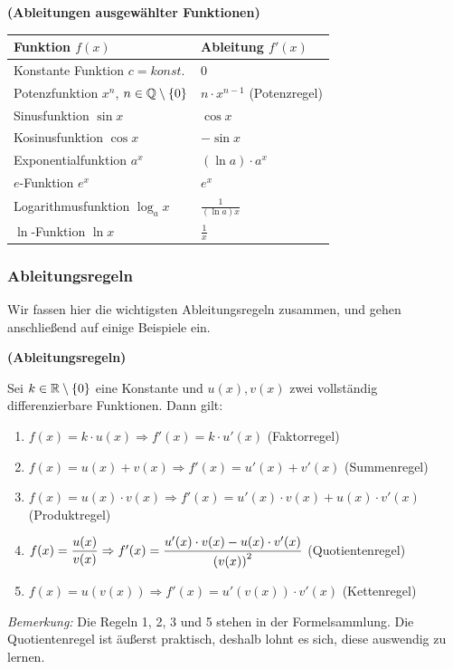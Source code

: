 \documentclass[ngerman, 12pt]{nssheetxea}
\begin{document}
\begin{theorem}\textbf{(Ableitungen ausgewählter Funktionen)} \par
\renewcommand{\arraystretch}{1.3}
\begin{tabularx}{\textwidth}{X | X}

\textbf{Funktion $f(x)$} & \textbf{Ableitung $f'(x)$} \\
\hline
Konstante Funktion \hfill $c=konst.$ & $0$ \\
\hline
Potenzfunktion \hfill $x^n$, $n\in\mathbb{Q} \setminus \{ 0 \}$ & $n\cdot x^{n-1}$ (Potenzregel) \\
\hline
Sinusfunktion \hfill $\sin x$ & $\cos x$ \\
\hline
Kosinusfunktion \hfill $\cos x$ & $-\sin x$ \\
\hline
Exponentialfunktion \hfill $a^x$ & $(\ln a)\cdot a^x$ \\
\hline
$e$-Funktion \hfill $e^x$ & $e^x$ \\
\hline
Logarithmusfunktion \hfill $\log_a x$ & $\frac{1}{(\ln a) x}$\\
\hline
$\ln$-Funktion \hfill $\ln x$ & $\frac{1}{x}$ \\
\end{tabularx}
\renewcommand{\arraystretch}{1}
\label{Satz:Ableitungen_Funktionen}
\end{theorem}

\subsubsection{Ableitungsregeln}
Wir fassen hier die wichtigsten Ableitungsregeln zusammen, und gehen anschließend auf einige Beispiele ein.

\begin{theorem} \textbf{(Ableitungsregeln)} \par
Sei $k\in \mathbb{R} \setminus \{ 0 \}$ eine Konstante und $u(x), v(x)$ zwei vollständig differenzierbare Funktionen. Dann gilt:
\begin{enumerate}
\item $f(x)= k \cdot u(x) \Rightarrow f'(x)=k \cdot u'(x)$ (Faktorregel)
\item $f(x)=u(x)+v(x) \Rightarrow f'(x)=u'(x)+v'(x)$ (Summenregel)
\item $f(x)=u(x) \cdot v(x) \Rightarrow f'(x)=u'(x)\cdot v(x) + u(x)\cdot v'(x)$ (Produktregel)
\item $f(x)=\dfrac{u(x)}{v(x)} \Rightarrow f'(x)=\dfrac{u'(x)\cdot v(x) - u(x) \cdot v'(x)}{\mleft( v(x) \mright)^2}$ (Quotientenregel)
\item $f(x)=u(v(x)) \Rightarrow f'(x)=u'(v(x))\cdot v'(x)$ (Kettenregel)
\end{enumerate}
\textit{Bemerkung:} Die Regeln 1, 2, 3 und 5 stehen in der Formelsammlung. Die Quotientenregel ist äußerst praktisch, deshalb lohnt es sich, diese auswendig zu lernen.
\label{Satz:Ableitungsregeln}
    
\end{theorem}
 
\end{document}
